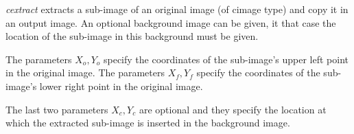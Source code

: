 {\em cextract} extracts a sub-image of an original image (of cimage type) and copy it in an output image. An optional background image can be given, it that
case the location of the sub-image in this background must be given. 

The parameters $X_o,Y_o$ specify the coordinates of the sub-image's upper left point in the original image.
The parameters $X_f,Y_f$ specify the coordinates of the sub-image's lower right point in the original image.

The last two parameters $X_c,Y_c$ are optional and they specify the location at which the extracted sub-image is inserted in the background image.

